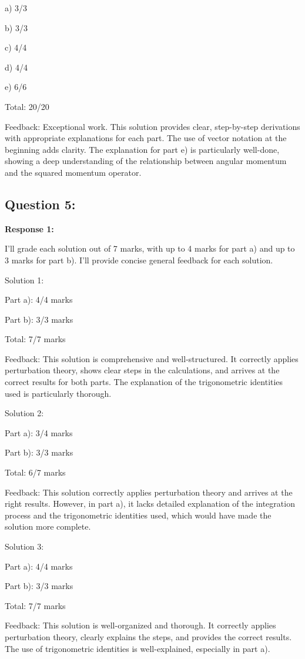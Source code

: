 \documentclass[a4paper,11pt]{article}
\begin{document}
a) 3/3

b) 3/3

c) 4/4

d) 4/4

e) 6/6

Total: 20/20

Feedback: Exceptional work. This solution provides clear, step-by-step derivations with appropriate explanations for each part. The use of vector notation at the beginning adds clarity. The explanation for part e) is particularly well-done, showing a deep understanding of the relationship between angular momentum and the squared momentum operator.

\subsection*{Question 5:}

\textbf{Response 1:}

I'll grade each solution out of 7 marks, with up to 4 marks for part a) and up to 3 marks for part b). I'll provide concise general feedback for each solution.

Solution 1:

Part a): 4/4 marks

Part b): 3/3 marks

Total: 7/7 marks

Feedback: This solution is comprehensive and well-structured. It correctly applies perturbation theory, shows clear steps in the calculations, and arrives at the correct results for both parts. The explanation of the trigonometric identities used is particularly thorough.

Solution 2:

Part a): 3/4 marks

Part b): 3/3 marks

Total: 6/7 marks

Feedback: This solution correctly applies perturbation theory and arrives at the right results. However, in part a), it lacks detailed explanation of the integration process and the trigonometric identities used, which would have made the solution more complete.

Solution 3:

Part a): 4/4 marks

Part b): 3/3 marks

Total: 7/7 marks

Feedback: This solution is well-organized and thorough. It correctly applies perturbation theory, clearly explains the steps, and provides the correct results. The use of trigonometric identities is well-explained, especially in part a).
\end{document}
